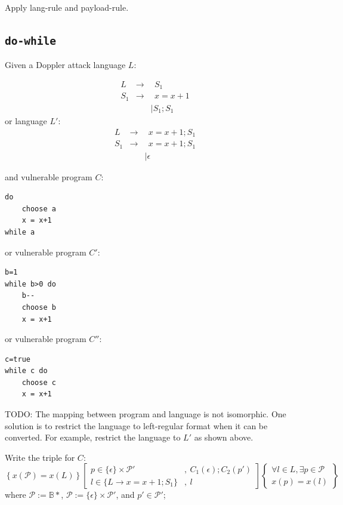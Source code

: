 \documentclass[12pt]{article}
\begin{document}
Apply lang-rule and payload-rule.



\subsection{\texttt{do-while}}
Given a Doppler attack language $L$:

\[
\begin{array}{rrl}
     L & \rightarrow & ~~S_1 \\
     S_1 & \rightarrow & ~~x=x+1 \\
     &  & \mid S_1;S_1
\end{array}
\]
or language $L'$:
\[
\begin{array}{rrl}
     L & \rightarrow & ~~x=x+1;S_1 \\
     S_1 & \rightarrow & ~~x=x+1; S_1 \\
     &  & \mid \epsilon
\end{array}
\]

and vulnerable program $C$:
\begin{lstlisting}
do
    choose a
    x = x+1
while a
\end{lstlisting}

or vulnerable program $C'$:
\begin{lstlisting}
b=1
while b>0 do
    b--
    choose b
    x = x+1
\end{lstlisting}

or vulnerable program $C''$:
\begin{lstlisting}
c=true
while c do
    choose c
    x = x+1
\end{lstlisting}
TODO: The mapping between program and language is not isomorphic. One solution is to restrict the language to left-regular format when it can be converted.
For example, restrict the language to $L'$ as shown above.

Write the triple for $C$:
\[
\left\{ x(\mathcal{P})=x(L) \right\}
\left[
\begin{array}{ll}
p \in \{\epsilon\} \times \mathcal{P}' & , ~C_1(\epsilon);C_2(p') \\
l \in \{L \rightarrow x=x+1;S_1\} & , ~l
\end{array}
\right]
\left\{
\begin{array}{c}
\forall l \in L , \exists p \in \mathcal{P} \\
x(p) = x(l)
\end{array}
\right\}
\]
where $\mathcal{P}:=\mathbb{B}*$, $\mathcal{P} := \{\epsilon\} \times \mathcal{P}'$, and $p' \in \mathcal{P}'$; 
\end{document}
